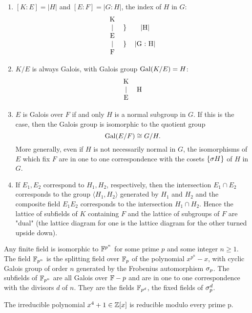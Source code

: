 \begin{thm}
\begin{enumerate}
\item $[K:E] = |H|$ and $[E:F] = |G:H|$, the index of $H$ in $G$:
\[\begin{tabular}{ccc}
K & & \\
| & \} & |H|\\
E & & \\
| & \} & |G\ :\ H|\\
F & & 
\end{tabular}\]
\item $K/E$ is always Galois, with Galois group $\text{Gal}(K/E) = H$:
\[\begin{tabular}{cc}
K & \\
| & H\\
E & 
\end{tabular}\]
\item $E$ is Galois over $F$ if and only $H$ is a normal subgroup in $G$. If this is the case, then the Galois group is isomorphic to the quotient group 
\[\text{Gal}(E/F)\cong G/H.\]
More generally, even if $H$ is not necessarily normal in $G$, the isomorphisms of $E$ which fix $F$ are in one to one correspondence with the cosets $\{\sigma H\}$ of $H$ in $G$.
\item If $E_1, E_2$ correspond to $H_1, H_2$, respectively, then the intersection $E_1\cap E_2$ corresponds to the group $\langle H_1, H_2\rangle$ generated by $H_1$ and $H_2$ and the composite field $E_1E_2$ corresponds to the intersection $H_1\cap H_2$. Hence the lattice of subfields of $K$ containing $F$ and the lattice of subgroups of $F$ are "dual" (the lattice diagram for one is the lattice diagram for the other turned upside down).
\end{enumerate}
\end{thm}

\nl

\begin{prop}
Any finite field is isomorphic to $\mathbb{F}^{p^n}$ for some prime $p$ and some integer $n\geq 1$. The field $\mathbb{F}_{p^n}$ is the splitting field over $\mathbb{F}_p$ of the polynomial $x^{p^n} - x$, with cyclic Galois group of order $n$ generated by the Frobenius automorphism $\sigma_p$. The subfields of $\mathbb{F}_{p^n}$ are all Galois over $\mathbb{F}-p$ and are in one to one correspondence with the divisors $d$ of $n$. They are the fields $\mathbb{F}_{p^d}$, the fixed fields of $\sigma_p^d$.
\end{prop}

\nl

\begin{cor}
The irreducible polynomial $x^4 + 1\in \mathbb{Z}[x]$ is reducible modulo every prime p.
\end{cor}

